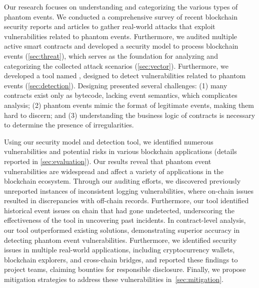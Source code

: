 Our research focuses on understanding and categorizing the various types of phantom events.
We conducted a comprehensive survey of recent blockchain security reports and articles to gather
real-world attacks that exploit vulnerabilities related to phantom events.
Furthermore, we audited multiple active smart contracts and developed a security model to process
blockchain events (\cref{sec:threat}), which serves as the foundation for analyzing and
categorizing the collected attack scenarios (\cref{sec:vector}).
Furthermore, we developed a tool named \tool, designed to detect vulnerabilities related to phantom
events (\cref{sec:detection}).
Designing \tool presented several challenges: (1) many contracts exist only as bytecode, lacking
event semantics, which complicates analysis; (2) phantom events mimic the format of legitimate
events, making them hard to discern; and (3) understanding the business logic of contracts is
necessary to determine the presence of irregularities.

Using our security model and detection tool, we identified numerous vulnerabilities and potential
risks in various blockchain applications (details reported in \cref{sec:evaluation}).
Our results reveal that phantom event vulnerabilities are widespread and affect a variety of
applications in the blockchain ecosystem. Through our auditing efforts, we discovered previously
unreported instances of inconsistent logging vulnerabilities, where on-chain issues resulted in
discrepancies with off-chain records.
Furthermore, our tool identified historical event issues on chain that had gone undetected,
underscoring the effectiveness of the tool in uncovering past incidents.
In contract-level analysis, our tool outperformed existing solutions, demonstrating superior
accuracy in detecting phantom event vulnerabilities.
Furthermore, we identified security issues in multiple real-world applications, including
cryptocurrency wallets, blockchain explorers, and cross-chain bridges, and reported these findings
to project teams, claiming bounties for responsible disclosure.
Finally, we propose mitigation strategies to address these vulnerabilities in~\cref{sec:mitigation}.

